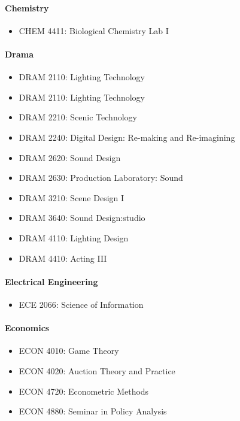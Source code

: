 \documentclass[10pt,letter]{book}
\newenvironment{itemlist}{
\begin{itemize}
\setlength{\itemsep}{0pt}
\setlength{\parskip}{0pt}}
{\end{itemize}}
\begin{document}
\paragraph{Chemistry}
\begin{itemlist}
\item CHEM 4411: Biological Chemistry Lab I
\end{itemlist}

\paragraph{Drama}
\begin{itemlist}
\item DRAM 2110: Lighting Technology
\item DRAM 2110: Lighting Technology
\item DRAM 2210: Scenic Technology
\item DRAM 2240: Digital Design: Re-making and Re-imagining
\item DRAM 2620: Sound Design
\item DRAM 2630: Production Laboratory: Sound
\item DRAM 3210: Scene Design I
\item DRAM 3640: Sound Design:studio
\item DRAM 4110: Lighting Design
\item DRAM 4410: Acting III
\end{itemlist}

\paragraph{Electrical Engineering}
\begin{itemlist}
\item ECE 2066: Science of Information
\end{itemlist}

\paragraph{Economics}
\begin{itemlist}
\item ECON 4010: Game Theory
\item ECON 4020: Auction Theory and Practice
\item ECON 4720: Econometric Methods
\item ECON 4880: Seminar in Policy Analysis
\end{itemlist}
\end{document}
